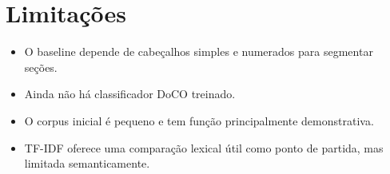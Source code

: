 \documentclass[12pt]{article}
\begin{document}
\section{Limitações}

\begin{itemize}
    \item O baseline depende de cabeçalhos simples e numerados para segmentar seções.
    \item Ainda não há classificador DoCO treinado.
    \item O corpus inicial é pequeno e tem função principalmente demonstrativa.
    \item TF-IDF oferece uma comparação lexical útil como ponto de partida, mas limitada semanticamente.
\end{itemize}
\end{document}
